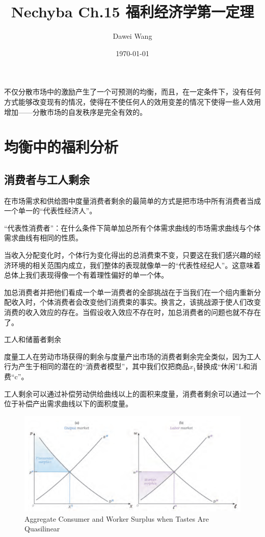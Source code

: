 \documentclass{article}
\title{Nechyba Ch.15 福利经济学第一定理}
\author{Dawei Wang}
\date{\today}
\begin{document}
	\maketitle

不仅分散市场中的激励产生了一个可预测的均衡，而且，在一定条件下，没有任何方式能够改变现有的情况，使得在不使任何人的效用变差的情况下使得一些人效用增加——分散市场的自发秩序是完全有效的。

\section{均衡中的福利分析}

\subsection{消费者与工人剩余}

在市场需求和供给图中度量消费者剩余的最简单的方式是把市场中所有消费者当成一个单一的“代表性经济人”。

\hspace*{\fill}

“代表性消费者”：在什么条件下简单加总所有个体需求曲线的市场需求曲线与个体需求曲线有相同的性质。

当收入分配变化时，个体行为变化得出的总消费束不变，只要这在我们感兴趣的经济环境的相关范围内成立，我们整体的表现就像单一的“代表性经纪人”。这意味着总体上我们表现得像一个有着理性偏好的单一个体。

加总消费者并把他们看成一个单一消费者的全部挑战在于当我们在一个组内重新分配收入时，个体消费者会改变他们消费束的事实。换言之，该挑战源于使人们改变消费的收入效应的存在。当假设收入效应不存在时，加总消费者的问题也就不存在了。

\hspace*{\fill}

工人和储蓄者剩余

度量工人在劳动市场获得的剩余与度量产出市场的消费者剩余完全类似，因为工人行为产生于相同的潜在的“消费者模型”，其中我们仅把商品$ x_1 $替换成“休闲”L和消费“c”。

工人剩余可以通过补偿劳动供给曲线以上的面积来度量，消费者剩余可以通过一个位于补偿产出需求曲线以下的面积度量。

\begin{figure}[H] %
	\centering %
	\includegraphics[width=1\textwidth]{15_1} %
	\caption{Aggregate Consumer and Worker Surplus when Tastes Are Quasilinear} %
	\label{Fig.main2} %
\end{figure}
\end{document}
